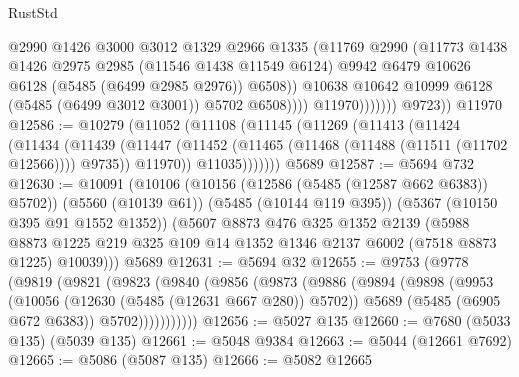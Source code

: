 \begin{lexlean}{RustStd}
\begin{coremodule}
                              @2990
                              @1426
                              @3000
                              @3012
                              @1329
                              @2966
                              @1335
                              (@11769
                                @2990
                                (@11773
                                  @1438
                                  @1426
                                  @2975
                                  @2985
                                  (@11546 @1438 @11549 @6124)
                                  @9942
                                  @6479
                                  @10626
                                  @6128
                                  (@5485 (@6499 @2985 @2976))
                                  @6508))
                              @10638
                              @10642
                              @10999
                              @6128
                              (@5485 (@6499 @3012 @3001))
                              @5702
                              @6508))))
                      @11970)))))))
        @9723))
    @11970
@12586 := @10279
    (@11052
      (@11108
        (@11145
          (@11269
            (@11413
              (@11424
                (@11434
                  (@11439
                    (@11447
                      (@11452 (@11465 (@11468 (@11488 (@11511 (@11702 @12566)))) @9735))
                      @11970))
                  @11035)))))))
    @5689
@12587 := @5694 @732
@12630 := @10091
    (@10106
      (@10156 (@12586 (@5485 (@12587 @662 @6383)) @5702))
      (@5560 (@10139 @61))
      (@5485 (@10144 @119 @395))
      (@5367 (@10150 @395 @91 @1552 @1352))
      (@5607
        @8873
        @476
        @325
        @1352
        @2139
        (@5988 @8873 @1225 @219 @325 @109 @14 @1352 @1346 @2137 @6002 (@7518 @8873 @1225) @10039)))
    @5689
@12631 := @5694 @32
@12655 := @9753
    (@9778
      (@9819
        (@9821
          (@9823
            (@9840
              (@9856
                (@9873
                  (@9886
                    (@9894
                      (@9898
                        (@9953
                          (@10056 (@12630 (@5485 (@12631 @667 @280)) @5702))
                          @5689
                          (@5485 (@6905 @672 @6383))
                          @5702)))))))))))
@12656 := @5027 @135
@12660 := @7680 (@5033 @135) (@5039 @135)
@12661 := @5048 @9384
@12663 := @5044 (@12661 @7692)
@12665 := @5086 (@5087 @135)
@12666 := @5082 @12665

\end{coremodule}
\end{lexlean}
